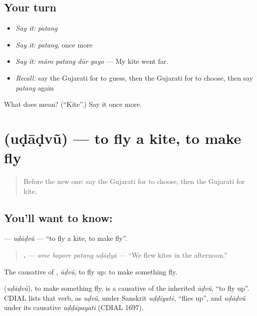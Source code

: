 \subsection*{Your turn}
\begin{itemize}
\raggedright
  \item \emph{Say it:} \emph{patang}
  \item \emph{Say it:} \emph{patang}, once more
  \item \emph{Say it:} \emph{māro patang dūr gayo} — My kite went far.
  \item \emph{Recall:} say the Gujarati for to guess, then the Gujarati for to choose, then say \emph{patang} again
\end{itemize}

\begin{tcolorbox}[breakable,colback=teal!4,colframe=teal!35!black,title={Before you move on}]
What does  mean? (\textquotedblleft{}Kite\textquotedblright{}.) Say it once more.
\end{tcolorbox}
\section[\texorpdfstring{\gu{ઉડાડવું} (uḍāḍvũ)}{ઉડાડવું (uḍāḍvũ)}]{ (uḍāḍvũ) — to fly a kite, to make fly}

\label{lesson:GU-C261-udadvu}



\begin{quote}
Before the new one: say the Gujarati for to choose, then the Gujarati for kite.
\end{quote}

\subsection*{You'll want to know: }
\textbf{} — \emph{uḍāḍvũ} — \textquotedblleft{}to fly a kite, to make fly\textquotedblright{}.

\begin{quote}
\textbf{   .} — \emph{ame bapore patang uḍāḍyā} — \textquotedblleft{}We flew kites in the afternoon.\textquotedblright{}
\end{quote}

The causative of \textbf{}, \emph{ūḍvũ}, to fly up: to make something fly.

\begin{cousinweb}
\textbf{} (\emph{uḍāḍvũ}), to make something fly, is a causative of the inherited \emph{ūḍvũ}, \textquotedblleft{}to fly up\textquotedblright{}. CDIAL lists that verb, as \emph{uḍvũ}, under Sanskrit \emph{uḍḍīyatē}, \textquotedblleft{}flies up\textquotedblright{}, and \emph{uḍāḍvũ} under its causative \emph{uḍḍāpayati} (CDIAL 1697).
\end{cousinweb}

